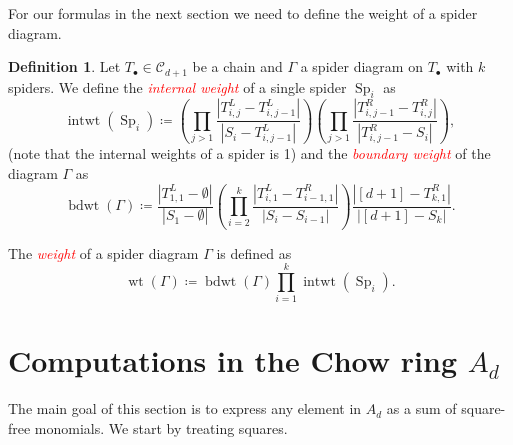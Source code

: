 \documentclass[10pt,a4paper]{amsart}
\theoremstyle{definition}
\newtheorem{defi}[thm]{Definition}
\newcommand{\important}[1]{\emph{\textcolor{red}{#1}}}
\DeclareMathOperator{\wt}{wt}
\DeclareMathOperator{\intwt}{intwt}
\DeclareMathOperator{\bdwt}{bdwt}
\DeclareMathOperator{\Sp}{Sp}
\newcommand{\D}{{\Gamma}}
\newcommand{\CC}{\mathcal{C}}
\begin{document}
\setcounter{thm}{9}
For our formulas in the next section we need to define the weight of a spider diagram.
\begin{defi}\label{def:weight}
	Let $T_\bullet\in\CC_{d+1}$ be a chain and $\D$ a spider diagram on $T_\bullet$ with $k$ spiders. 
	We define the \important{internal weight} of a single spider $\Sp_i$ as
	\begin{equation}%
	\intwt(\Sp_i)\coloneqq \left(\prod_{j>1}\dfrac{|T^L_{i,j}-T^L_{i,j-1}|}{|S_i-T^L_{i,j-1}|}\right)\left(\prod_{j>1}\dfrac{|T^R_{i,j-1}-T^R_{i,j}|}{|T^R_{i,j-1}-S_i|}\right), 
	\end{equation} 
	(note that the internal weights of a spider is 1) and the \important{boundary weight} of the diagram $\D$ as
	\begin{equation}%
	\bdwt(\D)\coloneqq \dfrac{|T^L_{1,1}-\emptyset|}{|S_1-\emptyset|}\left(\prod_{i=2}^{k}\dfrac{|T^L_{i,1}-T^R_{i-1,1}|}{|S_i-S_{i-1}|}\right)\dfrac{|[d+1]-T^R_{k,1}|}{|[d+1]-S_{k}|}.
	\end{equation}
	
	The \important{weight} of a spider diagram $\D$ is defined as
	\[
	\wt(\D)\coloneqq \bdwt(\D)\prod_{i=1}^{k} \intwt(\Sp_i).
	\]
\end{defi}

\section{Computations in the Chow ring \texorpdfstring{$A_d$}{Ad}}\label{sec:gen}

The main goal of this section is to express any element in $A_d$ as a sum of square-free monomials. We start by treating squares.
\end{document}
